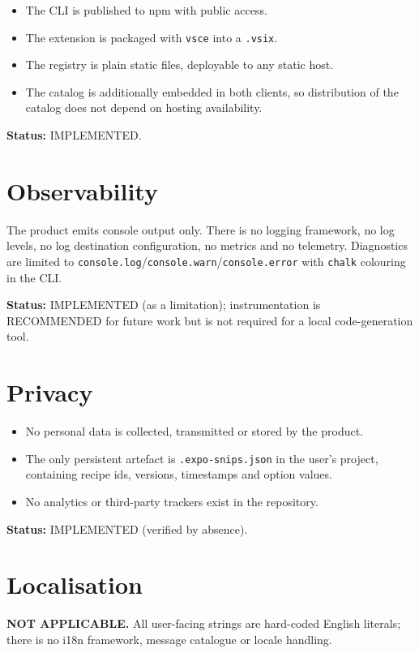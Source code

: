 \begin{itemize}
  \item The CLI is published to npm with public access.
  \item The extension is packaged with \texttt{vsce} into a \texttt{.vsix}.
  \item The registry is plain static files, deployable to any static host.
  \item The catalog is additionally embedded in both clients, so distribution of
        the catalog does not depend on hosting availability.
\end{itemize}

\textbf{Status:} IMPLEMENTED.

\section{Observability}

The product emits console output only. There is no logging framework, no log
levels, no log destination configuration, no metrics and no telemetry. Diagnostics
are limited to \texttt{console.log}/\texttt{console.warn}/\texttt{console.error}
with \texttt{chalk} colouring in the CLI.

\textbf{Status:} IMPLEMENTED (as a limitation); instrumentation is RECOMMENDED for
future work but is not required for a local code-generation tool.

\section{Privacy}

\begin{itemize}
  \item No personal data is collected, transmitted or stored by the product.
  \item The only persistent artefact is \texttt{.expo-snips.json} in the user's
        project, containing recipe ids, versions, timestamps and option values.
  \item No analytics or third-party trackers exist in the repository.
\end{itemize}

\textbf{Status:} IMPLEMENTED (verified by absence).

\section{Localisation}

\textbf{NOT APPLICABLE.} All user-facing strings are hard-coded English literals;
there is no i18n framework, message catalogue or locale handling.

